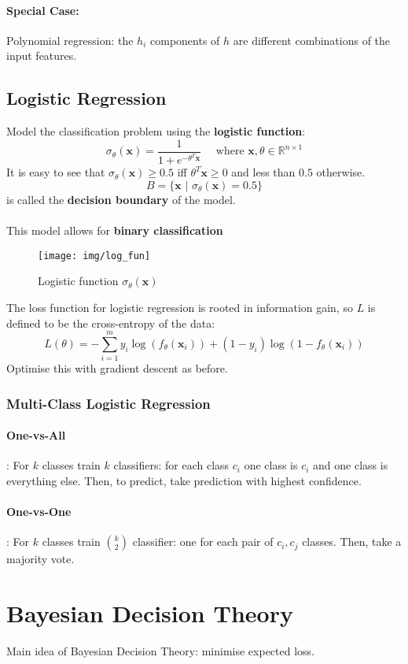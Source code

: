 \documentclass{article}
\renewcommand{\vec}[1]{\mathbf{#1}}
\renewcommand{\|}{\,\,|\,\,}
\newcommand{\Reals}{\mathbb{R}}
\begin{document}
\paragraph{Special Case:} Polynomial regression: the $h_i$ components of $h$ are
different combinations of the input features.
\subsection{Logistic Regression}
Model the classification problem using the \textbf{logistic function}:
\[
  \sigma_{\theta}(\vec{x}) = \frac{1}{1 + e^{-\theta^T\vec{x}}}\quad\text{ where
  } \vec{x}, \theta \in \Reals^{n \times 1}
\]
It is easy to see that $\sigma_\theta(\vec{x}) \geq 0.5$ iff $\theta^T\vec{x}
\geq 0$ and less than $0.5$ otherwise.
\[
  B = \{\vec{x} \,\,|\,\, \sigma_\theta(\vec{x}) = 0.5 \}
\]
is called the \textbf{decision boundary} of the model.
\paragraph{}
This model allows for \textbf{binary classification}
\begin{figure}[H]
  \centering
  \texttt{[image: img/log\_fun]}
  \caption{Logistic function $\sigma_{\theta}(\vec{x})$}
\end{figure}
The loss function for logistic regression is rooted in information gain, so $L$
is defined to be the cross-entropy of the data:
\[
  L(\theta) = -\sum_{i = 1}^m y_i\log (f_\theta(\vec{x}_i)) + (1 - y_i)\log(1 - f_\theta(\vec{x}_i))
\]
Optimise this with gradient descent as before.
\subsubsection{Multi-Class Logistic Regression}
\paragraph{One-vs-All}: For $k$ classes train $k$ classifiers: for each class
$c_i$ one class is $c_i$ and one class is everything else. Then, to predict,
take prediction with highest confidence.
\paragraph{One-vs-One}: For $k$ classes train $\binom{k}{2}$ classifier: one for
each pair of $c_i, c_j$ classes. Then, take a majority vote.
\section{Bayesian Decision Theory}
Main idea of Bayesian Decision Theory: minimise expected loss.
\end{document}

